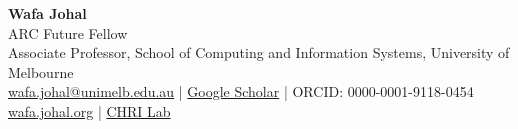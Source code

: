 \begin{center}
  {\Large\textbf{Wafa Johal}}\\[2pt]
  ARC Future Fellow \\
  Associate Professor, School of Computing and Information Systems,
  University of Melbourne\\[2pt]
  \href{mailto:wafa.johal@unimelb.edu.au}{wafa.johal@unimelb.edu.au}
  \;|\;
  \href{https://scholar.google.fr/citations?user=GR9bAl0AAAAJ}{Google Scholar}
  \;|\;
  ORCID: 0000-0001-9118-0454 \\
   \href{https://wafa.johal.org}{wafa.johal.org}
   \;|\;
  \href{https://chri-lab.github.io}{CHRI Lab}
\end{center}
